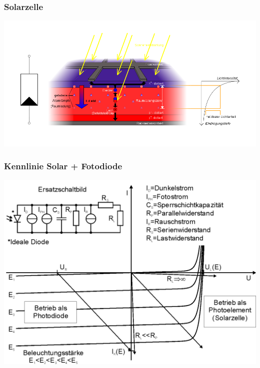 \begin{frame}
    \frametitle{Solarzelle}
        \begin{center}
            \includegraphics[width=1\textwidth]{a05/Solarzelle_Funktionsprinzip2.png}\\
            \tiny \hyperlink{refs}{\cite{wm}}
        \end{center}
\end{frame}

\begin{frame}
    \frametitle{Kennlinie Solar + Fotodiode}
        \begin{center}
            \includegraphics[width=1\textwidth]{a05/Kennlinie_Photodiode_1.png}\\
            \tiny \hyperlink{refs}{\cite{wm}}
        \end{center}
\end{frame}


